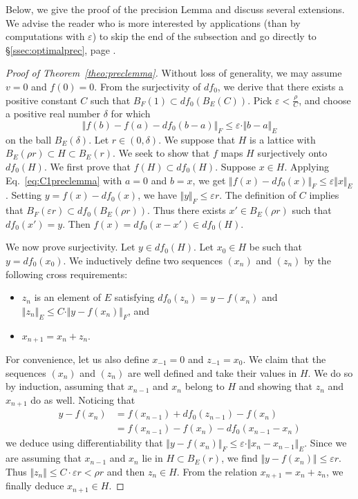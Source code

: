 \documentclass[11pt]{article}
\numberwithin{equation}{section}
\numberwithin{figure}{section}
\renewcommand{\leq}{\leqslant}
\theoremstyle{definition}
\begin{document}
Below, we give the proof of the precision Lemma and discuss several 
extensions. We advise the reader who is more interested by applications 
(than by computations with $\varepsilon$) to skip the end of the 
subsection and go directly to \S \ref{ssec:optimalprec}, page 
\pageref{ssec:optimalprec}.

\begin{proof}[Proof of Theorem~\ref{theo:preclemma}]
Without loss of generality, we may assume $v=0$ and $f(0)=0$. 
From the surjectivity of $df_0$, we derive that there exists a positive 
constant $C$ such that $B_F(1) \subset df_0(B_E(C))$.
Pick $\varepsilon < \frac\rho C$, and choose a positive real number 
$\delta$ for which
\begin{equation}
\label{eq:C1preclemma}
\Vert f(b) - f(a) - df_0(b{-}a) \Vert_F \leq 
\varepsilon \cdot \Vert b{-}a\Vert_E
\end{equation}
on the ball $B_E(\delta)$.
Let $r \in (0, \delta)$. We suppose that $H$ is a lattice with
$B_E(\rho r) \subset H \subset B_E(r).$
We seek to show that $f$ maps $H$ surjectively onto $df_0 (H)$. We first 
prove that $f(H) \subset df_0 (H)$. Suppose $x \in H$. Applying
Eq.~\eqref{eq:C1preclemma} with $a = 0$ and $b = x$, we get
$\Vert f(x)-df_0(x) \Vert_F \leq \varepsilon \Vert x \Vert_E$.
Setting $y=f(x)-df_0(x)$, we have $\Vert y \Vert_F \leq
\varepsilon r$. The definition of $C$ implies that $B_F(\varepsilon r)
\subset df_0 (B_E(\rho r))$. Thus there exists $x' \in B_E(\rho r)$ such 
that $df_0 (x') =y$. Then $f(x)= df_0 (x-x') \in df_0 (H)$.

We now prove surjectivity. Let $y \in df_0 (H)$. Let $x_0 \in H$
be such that $y = df_0 (x_0)$. We inductively define two sequences
$(x_n)$ and $(z_n)$ by the following cross requirements:
\begin{itemize}
\renewcommand{\itemsep}{0pt}
\item $z_n$ is an element of $E$ satisfying $df_0(z_n) = y -
f(x_n)$ and $\Vert z_n \Vert_E \leq C \cdot \Vert y - f(x_n) \Vert_F$, and
\item $x_{n+1}=x_n+z_n$.
\end{itemize}
For convenience, let us also define $x_{-1} = 0$ and $z_{-1}=x_0.$ We claim that the
sequences $(x_n)$ and $(z_n)$ are well defined and take their values in
$H$. We do so by induction, assuming that $x_{n-1}$ and $x_n$ belong to $H$
and showing that $z_n$ and $x_{n+1}$ do as well. Noticing that
\begin{equation}
\label{eq:mainlemma}
\begin{aligned}
y - f(x_n) &= f(x_{n-1}) + df_0(z_{n-1}) - f(x_n) \\
&= f(x_{n-1}) - f(x_n) - df_0(x_{n-1} - x_n)
\end{aligned}
\end{equation}
we deduce using differentiability that
$\Vert y - f(x_n) \Vert_F \leq \varepsilon \cdot \Vert x_n - x_{n-1}
\Vert_E$.
Since we are assuming that $x_{n-1}$ and $x_n$ lie in $H \subset
B_E(r)$, we find $\Vert y - f(x_n) \Vert \leq \varepsilon r$. Thus
$\Vert z_n \Vert \leq C \cdot \varepsilon r < \rho r$ and then
$z_n \in H$. From the relation $x_{n+1} = x_n + z_n$, we finally
deduce $x_{n+1} \in H$.


\end{proof}
\end{document}
